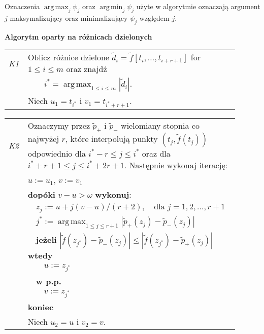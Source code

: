\documentclass[oik, pdftex, robocza, man]{mgrwms}
\DeclareMathOperator*{\argmax}{arg\,max}
\DeclareMathOperator*{\argmin}{arg\,min}
\begin{document}
    Oznaczenia $\argmax_{j} \psi_{j}$ oraz $\argmin_{j} \psi_{j}$ użyte w algorytmie oznaczają argument $j$ maksymalizujący oraz minimalizujący $\psi_{j}$ względem $j$.

    \vspace{10pt}
    \begin{table}[H]
        \begin{center}
            \textbf{Algorytm oparty na różnicach dzielonych}            
        \end{center}

        \begin{tabular}{p{0.045\linewidth} p{0.85\linewidth}}        
            \textit{K1}     & Oblicz różnice dzielone $\tilde{d}_i = \tilde{f}[t_i, \ldots, t_{i+r+1}]$ for $1 \leq i \leq m $ oraz znajdź \\
                            & \(\displaystyle \qquad i^* = \argmax_{1 \leq i \leq m }|\tilde{d}_i| \).  \\
                            & Niech $u_1 = t_{i^*}$ i $v_1 = t_{i^* + r + 1}$. \\
        \end{tabular}
    \end{table} \vspace{-20pt}
    \begin{table}[H]
        \begin{tabular}{p{0.045\linewidth} p{0.85\linewidth}}
        \textit{K2} & Oznaczymy przez $\tilde{p}_+$ i $\tilde{p}_-$ wielomiany stopnia co najwyżej $r$, które interpolują punkty $(t_j, \tilde{f}(t_j))$ odpowiednio dla $i^* - r \leq j \leq i^*$ oraz dla $i^* + r + 1 \leq j \leq i^* + 2r + 1$. Następnie wykonaj iterację: \\
                        & $u := u_1$, $v := v_1$ \\
                        & \textbf{dopóki} $v-u > \omega$ \textbf{wykonuj}: \\
                        & $\quad$$z_j := u + j(v-u) / (r+2), \quad\text{dla } j = 1, 2, \ldots, r + 1$ \\
                        & $\quad$\(\displaystyle j^* := \argmax_{1 \leq j \leq r + 1}|\tilde{p}_{+}(z_j) - \tilde{p}_{-}(z_j)| \) \\
                        & $\quad$\textbf{jeżeli} $|\tilde{f}(z_{j^*}) - \tilde{p}_{-}(z_j)| \leq |\tilde{f}(z_{j^*}) - \tilde{p}_{+}(z_j)|$ \textbf{wtedy} \\
                        & $\quad\quad$$u:= z_{j^*}$ \\
                        & $\quad$\textbf{w p.p.} \\
                        & $\quad\quad$$v:= z_{j^*}$ \\
                        & \textbf{koniec} \\
                        & Niech $u_2 = u$ i $v_2 = v$. \\
        \end{tabular}
    \end{table} \vspace{-20pt}
\end{document}

